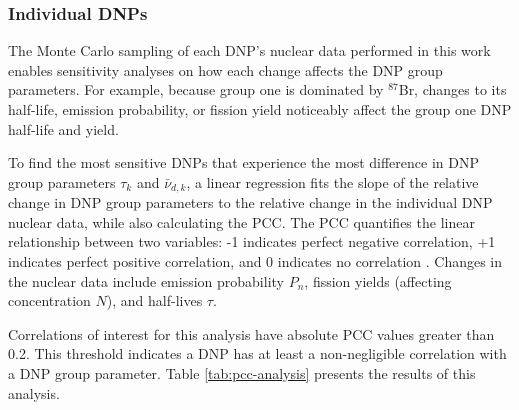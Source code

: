\FloatBarrier
\subsubsection{Individual \glspl{DNP}}
The Monte Carlo sampling of each \gls{DNP}'s nuclear data performed in this work enables sensitivity analyses on how each change affects the \gls{DNP} group parameters.
For example, because group one is dominated by $^{87}$Br, changes to its half-life, emission probability, or fission yield noticeably affect the group one \gls{DNP} half-life and yield.

To find the most sensitive \glspl{DNP} that experience the most difference in \gls{DNP} group parameters $\tau_{k}$ and $\bar{\nu}_{d,k}$, a linear regression fits the slope of the relative change in \gls{DNP} group parameters to the relative change in the individual \gls{DNP} nuclear data, while also calculating the \gls{PCC}.
The \gls{PCC} quantifies the linear relationship between two variables: -1 indicates perfect negative correlation, +1 indicates perfect positive correlation, and 0 indicates no correlation \cite{frey2018sage}.
Changes in the nuclear data include emission probability $P_n$, fission yields (affecting concentration $N$), and half-lives $\tau$.

Correlations of interest for this analysis have absolute \gls{PCC} values greater than 0.2.
This threshold indicates a \gls{DNP} has at least a non-negligible correlation with a \gls{DNP} group parameter.
Table \ref{tab:pcc-analysis} presents the results of this analysis.

